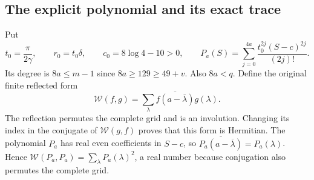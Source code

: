 \subsection{The explicit polynomial and its exact trace}
Put
\[
t_0=\frac\pi{2\gamma},\qquad r_0=t_0\delta,\qquad
c_0=8\log4-10>0,\qquad
P_a(S)=\sum_{j=0}^{4a}\frac{t_0^{2j}(S-c)^{2j}}{(2j)!}.
\tag{RBV2}
\]
Its degree is $8a\le m-1$ since $8a\ge129\ge49+v$.
Also $8a<q$. Define the original finite reflected form
\[
\mathcal W(f,g)=\sum_{\lambda}\overline{f(a-\overline\lambda)}g(\lambda).
\tag{RBV3}
\]
The reflection permutes the complete grid and is an involution.
Changing its index in the conjugate of $\mathcal W(g,f)$ proves
that this form is Hermitian. The polynomial $P_a$ has real even
coefficients in $S-c$, so
$\overline{P_a(a-\overline\lambda)}=P_a(\lambda)$.
Hence $\mathcal W(P_a,P_a)=\sum_\lambda P_a(\lambda)^2$, a real
number because conjugation also permutes the complete grid.

